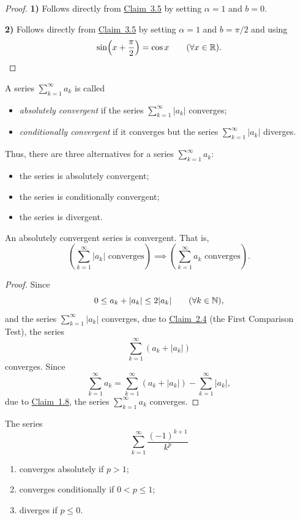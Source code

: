 \begin{proof}
\textbf{1)} Follows directly from \hyperref[claim:3.5]{Claim~3.5} by setting $\alpha=1$ and $b=0$.

\medskip
\noindent\textbf{2)} Follows directly from \hyperref[claim:3.5]{Claim~3.5} by setting $\alpha=1$ and $b=\pi/2$ and using
\[
\sin\!\left(x+\frac\pi2\right)=\cos x
\qquad(\forall x\in\mathbb{R}).
\]
\end{proof}

\begin{definition}\label{def:3.1}
A series $\sum_{k=1}^{\infty}a_k$ is called
\begin{itemize}
\item \emph{absolutely convergent} if the series $\sum_{k=1}^{\infty}|a_k|$ converges;
\item \emph{conditionally convergent} if it converges but the series $\sum_{k=1}^{\infty}|a_k|$ diverges.
\end{itemize}
Thus, there are three alternatives for a series $\sum_{k=1}^{\infty}a_k$:
\begin{itemize}
\item the series is absolutely convergent;
\item the series is conditionally convergent;
\item the series is divergent.
\end{itemize}
\end{definition}

\begin{claim}\label{claim:3.7}
An absolutely convergent series is convergent. That is,
\[
\left(\sum_{k=1}^{\infty}|a_k|\text{ converges}\right)
\implies
\left(\sum_{k=1}^{\infty}a_k\text{ converges}\right).
\]
\end{claim}

\begin{proof}
Since
\[
0\le a_k+|a_k|\le2|a_k|
\qquad(\forall k\in\mathbb{N}),
\]
and the series $\sum_{k=1}^{\infty}|a_k|$ converges, due to \hyperref[claim:2.4]{Claim~2.4} (the First Comparison Test), the series
\[
\sum_{k=1}^{\infty}(a_k+|a_k|)
\]
converges. Since
\[
\sum_{k=1}^{\infty}a_k
=\sum_{k=1}^{\infty}(a_k+|a_k|)
-\sum_{k=1}^{\infty}|a_k|,
\]
due to \hyperref[claim:1.8]{Claim~1.8}, the series $\sum_{k=1}^{\infty}a_k$ converges.
\end{proof}

\begin{claim}\label{claim:3.8}
The series
\[
\sum_{k=1}^{\infty}\frac{(-1)^{k+1}}{k^p}
\]
\begin{enumerate}[label=\arabic*)]
\item\label{item:claim:3.8:1} converges absolutely if $p>1$;
\item\label{item:claim:3.8:2} converges conditionally if $0<p\le1$;
\item\label{item:claim:3.8:3} diverges if $p\le0$.
\end{enumerate}
\end{claim}


